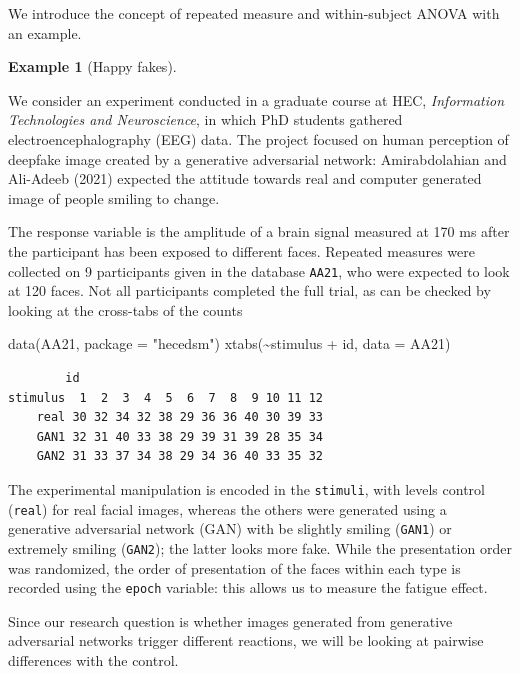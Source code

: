 \documentclass[
  11pt,
  letterpaper,
]{scrbook}
\newenvironment{Shaded}{\begin{snugshade}}{\end{snugshade}}
\newcommand{\AttributeTok}[1]{\textcolor[rgb]{0.40,0.45,0.13}{#1}}
\newcommand{\FunctionTok}[1]{\textcolor[rgb]{0.28,0.35,0.67}{#1}}
\newcommand{\NormalTok}[1]{\textcolor[rgb]{0.00,0.23,0.31}{#1}}
\newcommand{\SpecialCharTok}[1]{\textcolor[rgb]{0.37,0.37,0.37}{#1}}
\newcommand{\StringTok}[1]{\textcolor[rgb]{0.13,0.47,0.30}{#1}}
\theoremstyle{definition}
\newtheorem{example}{Example}[chapter]
\theoremstyle{definition}
\theoremstyle{remark}
\begin{document}
We introduce the concept of repeated measure and within-subject ANOVA
with an example.

\begin{example}[Happy
fakes]\protect\hypertarget{exm-happyfakes}{}\label{exm-happyfakes}

We consider an experiment conducted in a graduate course at HEC,
\emph{Information Technologies and Neuroscience}, in which PhD students
gathered electroencephalography (EEG) data. The project focused on human
perception of deepfake image created by a generative adversarial
network: Amirabdolahian and Ali-Adeeb (2021) expected the attitude
towards real and computer generated image of people smiling to change.

The response variable is the amplitude of a brain signal measured at 170
ms after the participant has been exposed to different faces. Repeated
measures were collected on 9 participants given in the database
\texttt{AA21}, who were expected to look at 120 faces. Not all
participants completed the full trial, as can be checked by looking at
the cross-tabs of the counts

\begin{Shaded}
\begin{Highlighting}[]
\FunctionTok{data}\NormalTok{(AA21, }\AttributeTok{package =} \StringTok{"hecedsm"}\NormalTok{)}
\FunctionTok{xtabs}\NormalTok{(}\SpecialCharTok{\textasciitilde{}}\NormalTok{stimulus }\SpecialCharTok{+}\NormalTok{ id, }\AttributeTok{data =}\NormalTok{ AA21)}
\end{Highlighting}
\end{Shaded}

\begin{verbatim}
        id
stimulus  1  2  3  4  5  6  7  8  9 10 11 12
    real 30 32 34 32 38 29 36 36 40 30 39 33
    GAN1 32 31 40 33 38 29 39 31 39 28 35 34
    GAN2 31 33 37 34 38 29 34 36 40 33 35 32
\end{verbatim}

The experimental manipulation is encoded in the \texttt{stimuli}, with
levels control (\texttt{real}) for real facial images, whereas the
others were generated using a generative adversarial network (GAN) with
be slightly smiling (\texttt{GAN1}) or extremely smiling
(\texttt{GAN2}); the latter looks more fake. While the presentation
order was randomized, the order of presentation of the faces within each
type is recorded using the \texttt{epoch} variable: this allows us to
measure the fatigue effect.

Since our research question is whether images generated from generative
adversarial networks trigger different reactions, we will be looking at
pairwise differences with the control.


\end{example}
\end{document}
